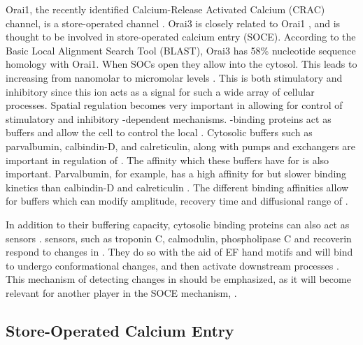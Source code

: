 Orai1, the recently identified Calcium-Release Activated Calcium (CRAC) channel, is a store-operated \Ca{} channel \citep{Prakriya2006, Vig2006, Feske2006, Zhang2006, Smyth2010}. 
Orai3 is closely related to Orai1 \citep{Feske2006, Taylor2006, Gwack2007}, and is thought to be involved in store-operated calcium entry (SOCE). According to the Basic Local Alignment Search Tool (BLAST), Orai3 has 58\% nucleotide sequence homology with Orai1. 
When SOCs open they allow \Ca{} into the cytosol. This leads to \cai{} increasing from nanomolar to micromolar levels \citep{Berridge2000}. This \Ca{} is both stimulatory and inhibitory \citep{Berridge2000} since this ion acts as a signal for such a wide array of cellular processes. Spatial regulation becomes very important in allowing for control of stimulatory and inhibitory \Ca-dependent mechanisms. \Ca-binding proteins act as buffers and allow the cell to control the local \cai. Cytosolic \Ca{} buffers such as parvalbumin, calbindin-D, and calreticulin, along with \Ca{} pumps and exchangers are important in regulation of \cai{} \citep{Berridge2000}. 
The affinity which these buffers have for \Ca{} is also important. Parvalbumin, for example, has a high affinity for \Ca{} but slower binding kinetics than calbindin-D and calreticulin \cite{Berridge2003}. The different \Ca{} binding affinities allow for buffers which can modify amplitude, recovery time and diffusional range of \Ca{} %
\cite{Berridge2003}. 


In addition to their buffering capacity, cytosolic \Ca{} binding proteins can also act as  \Ca{} sensors \citep{Berridge2000}.  \Ca{} sensors, such as troponin C, calmodulin, phospholipase C 
and recoverin respond to changes in \cai. They do so with the aid of %
 EF hand motifs and will bind \Ca{} to undergo conformational changes, and then activate downstream processes \citep{Berridge2000}. This mechanism of detecting changes in \cai{} should be emphasized, as it will become relevant for another player in the SOCE mechanism, \stim.

\subsection{Store-Operated Calcium Entry}

